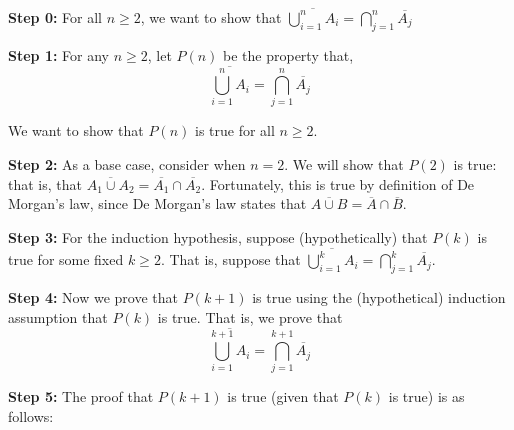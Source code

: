\documentclass{article}
\begin{document}
\textbf{Step 0:} For all $n\geq 2$, we want to show that $\overline{\bigcup_{i=1}^{n}A_i}=\bigcap_{j=1}^{n}\overline{A_j}$

\vspace{15pt}


\textbf{Step 1:} For any $n\geq 2$, let $P(n)$ be the property that,
\[
	\overline{\bigcup_{i=1}^{n}A_i}=\bigcap_{j=1}^{n}\overline{A_j}
\]

\hspace{15pt} We want to show that $P(n)$ is true for all $n\geq 2$.

\vspace{15pt}

\textbf{Step 2:} As a base case, consider when $n=2$. We will show that $P(2)$ is true: that is, that $\overline{A_1\cup A_2}=\overline{A_1}\cap\overline{A_2}$. Fortunately, this is true by definition of De Morgan's law, since De Morgan's law states that $\overline{A\cup B}=\overline{A}\cap\overline{B}$.

\vspace{15pt}

\textbf{Step 3:} For the induction hypothesis, suppose (hypothetically) that $P(k)$ is true for some fixed $k\geq 2$. That is, suppose that	$\overline{\bigcup_{i=1}^{k}A_i}=\bigcap_{j=1}^{k}\overline{A_j}$.
\vspace{15pt}

\textbf{Step 4:} Now we prove that $P(k+1)$ is true using the (hypothetical) induction assumption that $P(k)$ is true. That is, we prove that
\[
	\overline{\bigcup_{i=1}^{k+1}A_i}=\bigcap_{j=1}^{k+1}\overline{A_j}
\]
\vspace{15pt}

\textbf{Step 5:} The proof that $P(k+1)$ is true (given that $P(k)$ is true) is as follows: 
\end{document}
